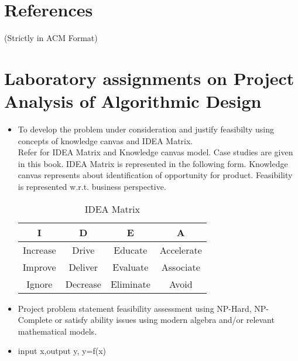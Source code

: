 \documentclass[oneside,a4paper,12pt]{report}
\begin{document}



\begin{appendices}

\chapter{References}
(Strictly in ACM Format)

\chapter{Laboratory assignments on Project Analysis of Algorithmic Design}
\begin{itemize}
\item To develop the problem under consideration and justify feasibilty using
concepts of knowledge canvas and IDEA Matrix.\\
Refer \cite{innovationbook} for IDEA Matrix and Knowledge canvas model. Case studies are given in this book. IDEA Matrix is represented in the following form. Knowledge canvas represents about identification  of opportunity for product. Feasibility is represented w.r.t. business perspective.\\ 

\begin{table}[!htbp]
\begin{center}
  \begin{tabular}{| c | c | c | c |}
\hline
 I & D & E & A \\ 
\hline
Increase & Drive & Educate & Accelerate \\
\hline
Improve & Deliver & Evaluate & Associate  \\
 \hline
Ignore & Decrease & Eliminate & Avoid \\
\hline
\end{tabular}
 \caption { IDEA Matrix }
 \label{tab:imatrix}
\end{center}
\end{table}

\item Project problem statement feasibility assessment using NP-Hard, NP-Complete or satisfy ability issues using modern algebra and/or relevant mathematical models.
\item input x,output y, y=f(x)
\end{itemize}


\end{appendices}
\end{document}
